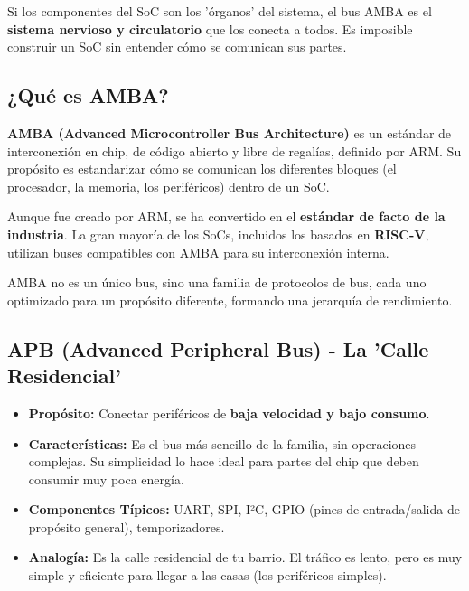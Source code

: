 \documentclass[12pt,a4paper]{article}
\begin{document}
Si los componentes del SoC son los 'órganos' del sistema, el bus AMBA es el \textbf{sistema nervioso y circulatorio} que los conecta a todos. Es imposible construir un SoC sin entender cómo se comunican sus partes.

\subsection{¿Qué es AMBA?}

\textbf{AMBA (Advanced Microcontroller Bus Architecture)} es un estándar de interconexión en chip, de código abierto y libre de regalías, definido por ARM. Su propósito es estandarizar cómo se comunican los diferentes bloques (el procesador, la memoria, los periféricos) dentro de un SoC.

Aunque fue creado por ARM, se ha convertido en el \textbf{estándar de facto de la industria}. La gran mayoría de los SoCs, incluidos los basados en \textbf{RISC-V}, utilizan buses compatibles con AMBA para su interconexión interna.

AMBA no es un único bus, sino una familia de protocolos de bus, cada uno optimizado para un propósito diferente, formando una jerarquía de rendimiento.

\subsection{APB (Advanced Peripheral Bus) - La 'Calle Residencial'}
\begin{itemize}
    \item \textbf{Propósito:} Conectar periféricos de \textbf{baja velocidad y bajo consumo}.
    \item \textbf{Características:} Es el bus más sencillo de la familia, sin operaciones complejas. Su simplicidad lo hace ideal para partes del chip que deben consumir muy poca energía.
    \item \textbf{Componentes Típicos:} UART, SPI, I²C, GPIO (pines de entrada/salida de propósito general), temporizadores.
    \item \textbf{Analogía:} Es la calle residencial de tu barrio. El tráfico es lento, pero es muy simple y eficiente para llegar a las casas (los periféricos simples).
\end{itemize}
\end{document}
